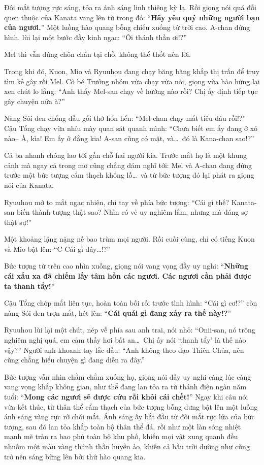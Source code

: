 \documentclass[../main.tex]{subfiles}
\begin{document}

Đôi mắt tượng rực sáng, tỏa ra ánh sáng linh thiêng kỳ lạ. Rồi giọng nói quá đỗi quen thuộc của Kanata vang lên từ trong đó: ``\textbf{Hãy yêu quý những người bạn của ngươi.}'' Một luồng hào quang bỗng chiếu xuống từ trời cao. A-chan đứng hình, lùi lại một bước đầy kinh ngạc: ``Ôi thánh thần ơi!?''

Mel thì vẫn đứng chôn chân tại chỗ, không thể thốt nên lời.

\ct

Trong khi đó, Kuon, Mio và Ryuuhou đang chạy băng băng khắp thị trấn để truy tìm kẻ gây rối Mel. Cô bé Trưởng nhóm vừa chạy vừa nói, giọng vừa hào hứng lại xen chút lo lắng: ``Anh thấy Mel-san chạy về hướng nào rồi? Chị ấy định tiếp tục gây chuyện nữa à?''

Nàng Sói đen chống đầu gối thở hổn hển: ``Mel-chan chạy mất tiêu đâu rồi!?'' Cậu Tổng chạy vừa nhíu mày quan sát quanh mình: ``Chưa biết em ấy đang ở xó nào-- À, kìa! Em ấy ở đằng kia! A-san cũng có mặt, và\dots\ đó là Kana-chan sao!?''

Cả ba nhanh chóng lao tới gần chỗ hai người kia. Trước mắt họ là một khung cảnh mà ngay cả trong mơ cũng chẳng dám nghĩ tới: Mel và A-chan đang đứng trước một bức tượng cẩm thạch khổng lồ\dots\ và từ bức tượng đó lại phát ra giọng nói của Kanata.

Ryuuhou mở to mắt ngạc nhiên, chỉ tay về phía bức tượng: ``Cái gì thế? Kanata-san biến thành tượng thật sao? Nhìn có vẻ uy nghiêm lắm, nhưng mà đáng sợ thật sự!''

Một khoảng lặng nặng nề bao trùm mọi người. Rồi cuối cùng, chỉ có tiếng Kuon và Mio bật lên: ``C-Cái gì đây\dots!?''

Bức tượng từ trên cao nhìn xuống, giọng nói vang vọng đầy uy nghi: ``\textbf{Những cái xấu xa đã chiếm lấy tâm hồn các ngươi. Các ngươi cần phải được ta thanh tẩy!}''

Cậu Tổng chớp mắt liên tục, hoàn toàn bối rối trước tình hình: ``Cái gì cơ!?'' còn nàng Sói đen trợn mắt, hét lên: ``\textbf{Cái quái gì đang xảy ra thế này!?}''

Ryuuhou lùi lại một chút, nép về phía sau anh trai, nói nhỏ: ``Onii-san, nó trông nghiêm nghị quá, em cảm thấy hơi bất an\dots\ Chị ấy nói `thanh tẩy' là thế nào vậy?'' Người anh khoanh tay lắc đầu: ``Anh không theo đạo Thiên Chúa, nên cũng chẳng hiểu chuyện gì đang diễn ra đây.''

Bức tượng vẫn nhìn chằm chằm xuống họ, giọng nói đầy uy nghi càng lúc càng vang vọng khắp không gian, như thể đang lan tỏa ra từ thánh điện ngàn năm tuổi: ``\textbf{Mong các ngươi sẽ được cứu rỗi khỏi cái chết!}'' Ngay khi câu nói vừa kết thúc, từ thân thể cẩm thạch của bức tượng bỗng dưng bật lên một luồng ánh sáng vàng rực rỡ chói mắt. Ánh sáng ấy bắt đầu từ đôi mắt rực lửa của bức tượng, sau đó lan tỏa khắp toàn bộ thân thể đá, rồi như một làn sóng nhiệt mạnh mẽ tràn ra bao phủ toàn bộ khu phố, khiến mọi vật xung quanh đều nhuốm một màu vàng thánh thần huyền ảo, khiến cả bầu trời dường như cũng trở nên sáng bừng lên bởi thứ hào quang kia.
\end{document}
